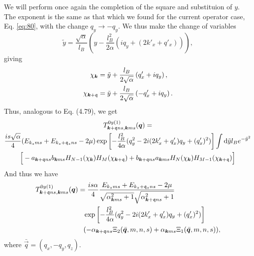 We will perform once again the completion of the square and substituion of \(y\).
The exponent is the same as that which we found for the current operator case, Eq. \eqref{eq:80}, with the change \(q_{y} \to - q_{y}\).
We thus make the change of variables
\begin{equation}
  \label{eq:90}
  \tilde{y} = \frac{\sqrt{\alpha}}{l_{B}} \left(y  - \frac{l_{B}^2}{2 \alpha } (i q_{y} + (2k' _x + q' _x) )\right),
\end{equation}
giving
\begin{align}
  \chi _{\bm{k}} &= \tilde{y} + \frac{l_{B}}{2 \sqrt{\alpha }} \left( q'_x + i q_{y}\right),\\
  \chi _{\bm{k} + \mathfrak{q}} &= \tilde{y} + \frac{l_{B}}{2 \sqrt{\alpha }} \left( -q' _{x} + i q_{y}\right).
\end{align}
Thus, analogous to Eq. (4.79), we get
\begin{multline}
  \label{eq:91}
  T_{\bm{k} + \mathfrak{q} n s, \bm{k} m s}^{0y (1)} (\bm{q}) =\\
  \frac{is \sqrt{\alpha }}{4}
  (E_{k_z m s} + E_{k_z + \mathfrak{q}_z n s} - 2 \mu)
  \exp \left[
    -\frac{l_{B}^2}{4 \alpha } (q_{y}^2 - 2i (2 k' _x + q' _x) q_{y} + (q' _x)^2 )
  \right  ]
  \int \mathrm{d} \tilde{y} l_{B} e^{-\tilde{y}^2}\\
 \Big[
  - a_{\bm{k} + \mathfrak{q} ns} b_{\bm{k} m s}
  H_{N-1} ( \chi _{\bm{k}} )
  H_{M} ( \chi _{\bm{k} + \mathfrak{q}} )
  + b_{\bm{k} + \mathfrak{q} ns } a_{\bm{k} m s}
  H_{N}( \chi _{\bm{k}} )
  H_{M-1} ( \chi _{\bm{k} + \mathfrak{q}} )
  \Big]
\end{multline}
And thus we have
\begin{align}
  T_{\vec{k} + \qvec{q} n s, \vec{k} m s}^{0y (1)} (\vec{q}) &=
  \frac{is \alpha }{4  }
  \frac{E_{k_z m s} + E_{k_z + \qvec{q}_z n s} - 2 \mu}{
    \sqrt{\alpha _{\vec{k} m s}^2 + 1}
    \sqrt{\alpha _{\vec{k} + \qvec{q} n s}^2 + 1}
  }\\
  &\pe \exp \left[
    -\frac{l_{B}^2}{4 \alpha } (q_{y}^2 - 2i ( 2k' _x + q' _x ) q_{y} + (q' _x)^2)
  \right  ]\\
  &\pe (-\alpha_{\vec{k}+\qvec{q} n s} \Xi_{2} (\bar{\vec{q}}, m, n, s) + \alpha_{\vec{k} m s} \Xi_{1}(\bar{\vec{q}}, m, n, s)),
\end{align}
where \(\bar{\vec{q}} = (q_{x}, -q_{y}, q_{z})\).

